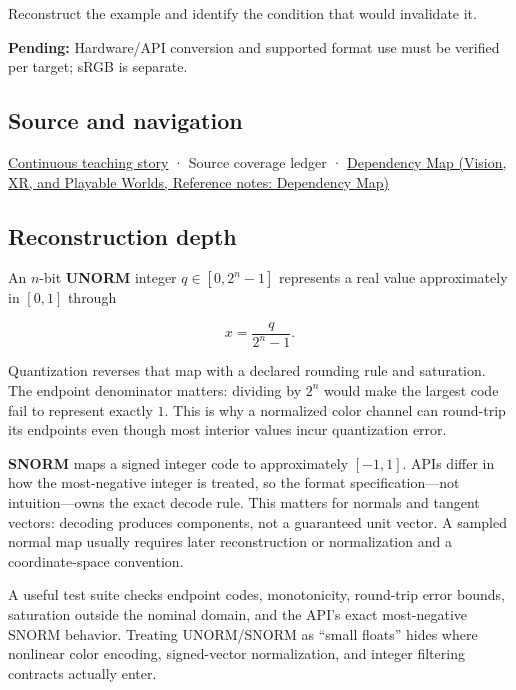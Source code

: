 \hypertarget{appendix-b2402c453dac-recall-and-next-depth}{}

Reconstruct the example and identify the condition that would invalidate it.

\textbf{Pending:} Hardware/API conversion and supported format use must be verified per target; sRGB is separate.

\subsection{Source and navigation}\label{appendix-b2402c453dac-source-and-navigation}

\hypertarget{appendix-b2402c453dac-source-and-navigation}{}

\hyperref[01-foundations-i-ch001-choosing-what-information-to-keep]{Continuous teaching story} · {Source coverage ledger} · \href{../07-Vision-XR-and-Playable-Worlds/main.pdf\#nameddest=appendix-4ad47bdd269a}{Dependency Map (Vision, XR, and Playable Worlds, Reference notes: Dependency Map)}

\subsection{Reconstruction depth}\label{appendix-b2402c453dac-reconstruction-depth}

\hypertarget{appendix-b2402c453dac-reconstruction-depth}{}

An \(n\)-bit \textbf{UNORM} integer \(q\in[0,2^n-1]\) represents a real value approximately in \([0,1]\) through

\[
x = \frac{q}{2^n-1}.
\]

Quantization reverses that map with a declared rounding rule and saturation. The endpoint denominator matters: dividing by \(2^n\) would make the largest code fail to represent exactly \(1\). This is why a normalized color channel can round-trip its endpoints even though most interior values incur quantization error.

\textbf{SNORM} maps a signed integer code to approximately \([-1,1]\). APIs differ in how the most-negative integer is treated, so the format specification---not intuition---owns the exact decode rule. This matters for normals and tangent vectors: decoding produces components, not a guaranteed unit vector. A sampled normal map usually requires later reconstruction or normalization and a coordinate-space convention.

A useful test suite checks endpoint codes, monotonicity, round-trip error bounds, saturation outside the nominal domain, and the API's exact most-negative SNORM behavior. Treating UNORM/SNORM as ``small floats'' hides where nonlinear color encoding, signed-vector normalization, and integer filtering contracts actually enter.
